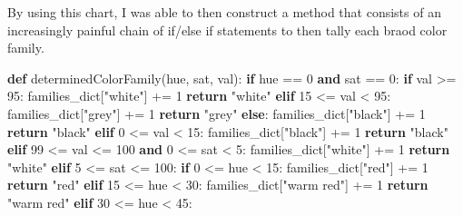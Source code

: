 \documentclass[11pt]{article}
\newenvironment{Shaded}{}{}
\newcommand{\KeywordTok}[1]{\textcolor[rgb]{0.00,0.44,0.13}{\textbf{{#1}}}}
\newcommand{\DecValTok}[1]{\textcolor[rgb]{0.25,0.63,0.44}{{#1}}}
\newcommand{\StringTok}[1]{\textcolor[rgb]{0.25,0.44,0.63}{{#1}}}
\newcommand{\NormalTok}[1]{{#1}}
\newcommand{\ControlFlowTok}[1]{\textcolor[rgb]{0.00,0.44,0.13}{\textbf{{#1}}}}
\newcommand{\OperatorTok}[1]{\textcolor[rgb]{0.40,0.40,0.40}{{#1}}}
\begin{document}
By using this chart, I was able to then construct a method that consists
of an increasingly painful chain of if/else if statements to then tally
each braod color family.

\begin{Shaded}
\begin{Highlighting}[]
\KeywordTok{def}\NormalTok{ determinedColorFamily(hue, sat, val):}
    \ControlFlowTok{if}\NormalTok{ hue }\OperatorTok{==} \DecValTok{0} \KeywordTok{and}\NormalTok{ sat }\OperatorTok{==} \DecValTok{0}\NormalTok{:}
        \ControlFlowTok{if}\NormalTok{ val }\OperatorTok{>=} \DecValTok{95}\NormalTok{:}
\NormalTok{            families_dict[}\StringTok{"white"}\NormalTok{] }\OperatorTok{+=} \DecValTok{1}
            \ControlFlowTok{return} \StringTok{"white"}
        \ControlFlowTok{elif} \DecValTok{15} \OperatorTok{<=}\NormalTok{ val }\OperatorTok{<} \DecValTok{95}\NormalTok{:}
\NormalTok{            families_dict[}\StringTok{"grey"}\NormalTok{] }\OperatorTok{+=} \DecValTok{1}
            \ControlFlowTok{return} \StringTok{"grey"}
        \ControlFlowTok{else}\NormalTok{:}
\NormalTok{            families_dict[}\StringTok{"black"}\NormalTok{] }\OperatorTok{+=} \DecValTok{1}
            \ControlFlowTok{return} \StringTok{"black"}
    \ControlFlowTok{elif} \DecValTok{0} \OperatorTok{<=}\NormalTok{ val }\OperatorTok{<} \DecValTok{15}\NormalTok{:}
\NormalTok{        families_dict[}\StringTok{"black"}\NormalTok{] }\OperatorTok{+=} \DecValTok{1}
        \ControlFlowTok{return} \StringTok{"black"}
    \ControlFlowTok{elif} \DecValTok{99} \OperatorTok{<=}\NormalTok{ val }\OperatorTok{<=} \DecValTok{100} \KeywordTok{and} \DecValTok{0} \OperatorTok{<=}\NormalTok{ sat }\OperatorTok{<} \DecValTok{5}\NormalTok{:}
\NormalTok{        families_dict[}\StringTok{"white"}\NormalTok{] }\OperatorTok{+=} \DecValTok{1}
        \ControlFlowTok{return} \StringTok{"white"}
    \ControlFlowTok{elif} \DecValTok{5} \OperatorTok{<=}\NormalTok{ sat }\OperatorTok{<=} \DecValTok{100}\NormalTok{:}
        \ControlFlowTok{if} \DecValTok{0} \OperatorTok{<=}\NormalTok{ hue }\OperatorTok{<} \DecValTok{15}\NormalTok{:}
\NormalTok{            families_dict[}\StringTok{"red"}\NormalTok{] }\OperatorTok{+=} \DecValTok{1}
            \ControlFlowTok{return} \StringTok{"red"}
        \ControlFlowTok{elif} \DecValTok{15} \OperatorTok{<=}\NormalTok{ hue }\OperatorTok{<} \DecValTok{30}\NormalTok{:}
\NormalTok{            families_dict[}\StringTok{"warm red"}\NormalTok{] }\OperatorTok{+=} \DecValTok{1}
            \ControlFlowTok{return} \StringTok{"warm red"}
        \ControlFlowTok{elif} \DecValTok{30} \OperatorTok{<=}\NormalTok{ hue }\OperatorTok{<} \DecValTok{45}\NormalTok{:}

\end{Highlighting}
\end{Shaded}
\end{document}

